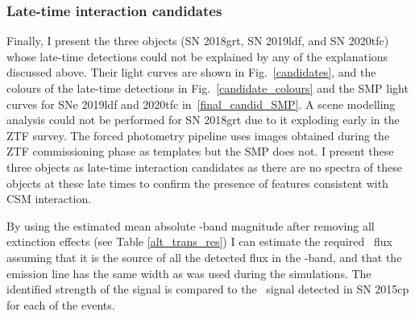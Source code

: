 \documentclass[a4paper,oneside,12pt, class=Latex/Classes/PhDthesisPSnPDF, crop=false]{standalone}
\begin{document}
\subsubsection{Late-time interaction candidates}
\label{sec:late_time_cand}
Finally, I present the three objects (SN 2018grt, SN 2019ldf, and SN 2020tfc) whose late-time detections could not be explained by any of the explanations discussed above. Their light curves are shown in Fig.~\ref{candidates}, and the colours of the late-time detections in Fig.~\ref{candidate_colours} and the SMP light curves for SNe 2019ldf and 2020tfc in~\ref{final_candid_SMP}. A scene modelling analysis could not be performed for SN 2018grt due to it exploding early in the ZTF survey. The forced photometry pipeline uses images obtained during the ZTF commissioning phase as templates but the SMP does not. I present these three objects as late-time interaction candidates as there are no spectra of these objects at these late times to confirm the presence of features consistent with CSM interaction.

By using the estimated mean absolute \ztfr-band magnitude after removing all extinction effects (see Table \ref{alt_trans_res}) I can estimate the required \Halpha~flux assuming that it is the source of all the detected flux in the \ztfr-band, and that the emission line has the same width as was used during the simulations. The identified strength of the signal is compared to the \Halpha~signal detected in SN 2015cp for each of the events.\\
\end{document}
